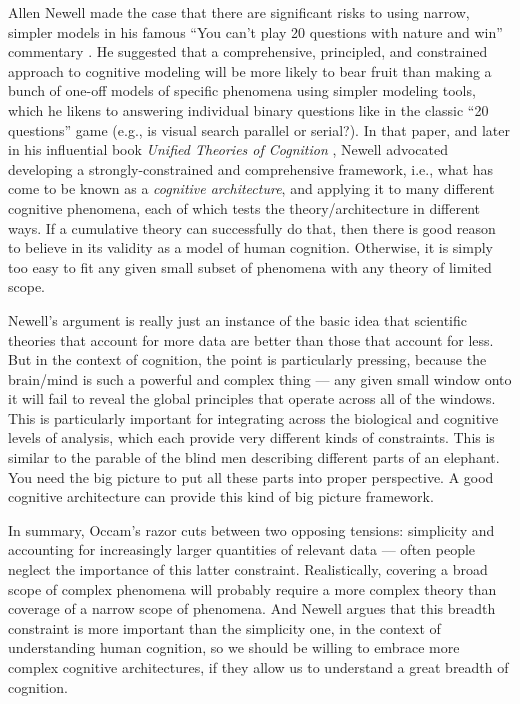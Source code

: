 \documentclass[11pt,twoside]{article}
\begin{document}
Allen Newell made the case that there are significant risks to using narrow,
simpler models in his famous ``You can't play 20 questions with nature and
win'' commentary \cite{Newell73}.  He suggested that a comprehensive,
principled, and constrained approach to cognitive modeling will be more likely
to bear fruit than making a bunch of one-off models of specific phenomena
using simpler modeling tools, which he likens to answering individual binary
questions like in the classic ``20 questions'' game (e.g., is visual search
parallel or serial?).  In that paper, and later in his influential book {\em
  Unified Theories of Cognition} , Newell advocated
developing a strongly-constrained and comprehensive framework, i.e., what has
come to be known as a {\em cognitive architecture}, and applying it to many
different cognitive phenomena, each of which tests the theory/architecture in
different ways.  If a cumulative theory can successfully do that, then there
is good reason to believe in its validity as a model of human cognition.
Otherwise, it is simply too easy to fit any given small subset of phenomena
with any theory of limited scope.

Newell's argument is really just an instance of the basic idea that scientific
theories that account for more data are better than those that account for
less.  But in the context of cognition, the point is particularly pressing,
because the brain/mind is such a powerful and complex thing --- any given
small window onto it will fail to reveal the global principles that operate
across all of the windows.  This is particularly important for integrating
across the biological and cognitive levels of analysis, which each provide
very different kinds of constraints.  This is similar to the parable of the
blind men describing different parts of an elephant.  You need the big picture
to put all these parts into proper perspective.  A good cognitive architecture
can provide this kind of big picture framework.

In summary, Occam's razor cuts between two opposing tensions: simplicity and
accounting for increasingly larger quantities of relevant data --- often
people neglect the importance of this latter constraint.  Realistically,
covering a broad scope of complex phenomena will probably require a more
complex theory than coverage of a narrow scope of phenomena.  And Newell
argues that this breadth constraint is more important than the simplicity one,
in the context of understanding human cognition, so we should be willing to
embrace more complex cognitive architectures, if they allow us to understand a
great breadth of cognition.
\end{document}
